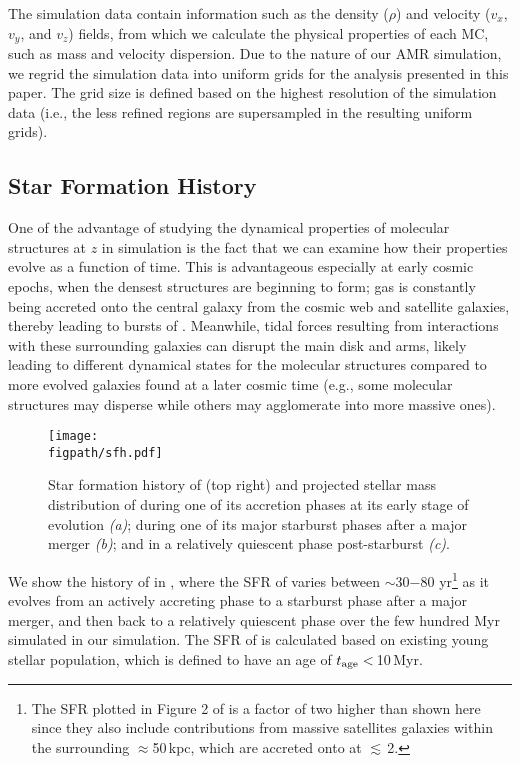 \documentclass[iop]{emulateapj}
\newcommand{\AP}[1]{({\bf \color{apcolor} AP: #1})}
\newcommand{\DL}[1]{({\bf \color{dlcolor} DL: #1})}
\begin{document}
The simulation data contain information such as the density ($\rho$) and velocity ($v_x$, $v_y$, and $v_z$) fields, from which we calculate 
the physical properties of each MC, such as mass and velocity dispersion.
Due to the nature of our AMR simulation, we regrid the simulation data into uniform grids for the analysis presented in this paper. 
The grid size is defined 
based on the highest resolution of the simulation data (i.e., the less refined regions are supersampled in the resulting uniform grids). 



\subsection{Star Formation History} \label{sec:sfh}
One of the advantage of studying the dynamical properties of molecular structures at
$z$ in simulation is the fact that we can examine how their properties evolve
as a function of time.
This is advantageous especially at early cosmic epochs,
when the densest structures are beginning to form;
gas is constantly being accreted onto the central galaxy from the cosmic web and
satellite galaxies, thereby leading to bursts of \SF.
Meanwhile, tidal forces resulting from interactions with these surrounding
galaxies can disrupt the main disk and arms, likely leading to different dynamical states
for the molecular structures compared to more evolved galaxies found at 
a later cosmic time (e.g., some molecular structures may disperse while others may agglomerate into more massive
ones). %

\begin{figure*}[!htbp]
\centering
\texttt{[image: \\figpath/sfh.pdf]}
\caption{
	Star formation history of \flower (top right) and
	projected stellar mass distribution of \flower during one of its accretion phases
	at its early stage of evolution {\it (a)}; during one of its major starburst phases
	after a major merger {\it (b)}; and in a relatively quiescent phase post-starburst {\it (c)}.
\label{fig:SFH}}
\end{figure*}


We show the \SF history of \flower in , where
the SFR of \flower varies between $\sim$30$-$80\,\Msun\,yr\pmOne\footnote{
The SFR plotted in Figure 2 of \citet{Pallottini17b}
is a factor of two higher than shown here since they also include contributions from
massive satellites galaxies within the surrounding $\approx$50\,kpc, which
are accreted onto \flower at \z$\lesssim$\,2.}
as it evolves from an actively accreting phase to
a starburst phase after a major merger, and then back to a relatively quiescent phase
over the few hundred Myr simulated in our simulation.
The SFR of \flower is calculated based on existing young stellar population, which is
defined to have an age of $t_{\rm age}<$\,10\,Myr.
\end{document}
